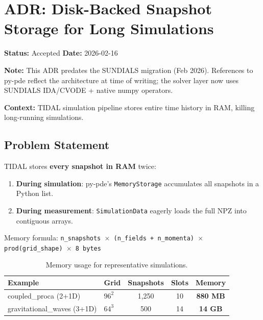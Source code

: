 
\section{ADR: Disk-Backed Snapshot Storage for Long Simulations}
\label{sec:adr-disk-storage}

\textbf{Status:} Accepted \quad
\textbf{Date:} 2026-02-16

\textbf{Note:} This ADR predates the SUNDIALS migration (Feb 2026). References to py-pde reflect the architecture at time of writing; the solver layer now uses SUNDIALS IDA/CVODE + native numpy operators.

\textbf{Context:} TIDAL simulation pipeline stores entire time history in RAM, killing long-running simulations.


\subsection{Problem Statement}
\label{sec:adr-problem}

TIDAL stores \textbf{every snapshot in RAM} twice:

\begin{enumerate}
  \item \textbf{During simulation}: py-pde's \texttt{MemoryStorage} accumulates all snapshots in a Python list.
  \item \textbf{During measurement}: \texttt{SimulationData} eagerly loads the full NPZ into contiguous arrays.
\end{enumerate}

Memory formula: \texttt{n\_snapshots $\times$ (n\_fields + n\_momenta) $\times$ prod(grid\_shape) $\times$ 8 bytes}

\begin{table}[htbp]
\centering
\caption{Memory usage for representative simulations.}
\label{tab:adr-memory}
\begin{tabular}{@{}llccc@{}}
\toprule
Example & Grid & Snapshots & Slots & Memory \\
\midrule
coupled\_proca (2+1D) & $96^2$ & 1{,}250 & 10 & \textbf{880 MB} \\
gravitational\_waves (3+1D) & $64^3$ & 500 & 14 & \textbf{14 GB} \\
\bottomrule
\end{tabular}
\end{table}

